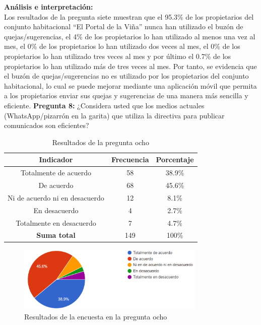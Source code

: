 \textbf{Análisis e interpretación:}\\
Los resultados de la pregunta siete muestran que el 95.3\% de los propietarios del conjunto habitacional {\textquotedblleft}El Portal de la Viña{\textquotedblright} nunca han utilizado el buzón de quejas/sugerencias, el 4\% de los propietarios lo han utilizado al menos una vez al mes, el 0\% de los propietarios lo han utilizado dos veces al mes, el 0\% de los propietarios lo han utilizado tres veces al mes y por último el 0.7\% de los propietarios lo han utilizado más de tres veces al mes.
Por tanto, se evidencia que el buzón de quejas/sugerencias no es utilizado por los propietarios del conjunto habitacional, lo cual se puede mejorar mediante una aplicación móvil que permita a los propietarios enviar sus quejas y sugerencias de una manera más sencilla y eficiente.
\bigbreak
\textbf{Pregunta 8:} ¿Considera usted que los medios actuales (WhatsApp/pizarrón en la garita) que utiliza la directiva para publicar comunicados son eficientes?

    \begin{table}[H]
        \centering
        \caption{Resultados de la pregunta ocho}
        \begin{tabular}{|c|c|c|}
            \hline
            \textbf{Indicador} & \textbf{Frecuencia} &  \textbf{Porcentaje} \\
            \hline
            Totalmente de acuerdo & 58 & 38.9\% \\
            \hline
            De acuerdo & 68 & 45.6\% \\
            \hline
            Ni de acuerdo ni en desacuerdo & 12 & 8.1\% \\
            \hline
            En desacuerdo & 4 & 2.7\% \\
            \hline
            Totalmente en desacuerdo & 7 & 4.7\% \\
            \hline
            \textbf{Suma total} & 149 & 100\% \\
            \hline
        \end{tabular}\label{tab:table_preg_8}
    \end{table}
    \begin{figure}[H]
        \centering
        \includegraphics[width=0.8\textwidth]{resources/images/p8}
        \caption{Resultados de la encuesta en la pregunta ocho}\label{fig:figure_p8}
    \end{figure}

